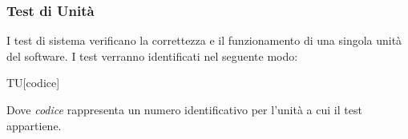\documentclass[../piano-di-qualifica.tex]{subfiles}
\begin{document}
  \subsubsection{Test di Unità}%
  \label{subs:unita}
    I test di sistema verificano la correttezza e il funzionamento di una singola unità del software. I test verranno identificati nel seguente modo:
    \begin{center}
      TU[codice]
    \end{center}
    Dove \textit{codice} rappresenta un numero identificativo per l'unità a cui il test appartiene.
  
\end{document}
